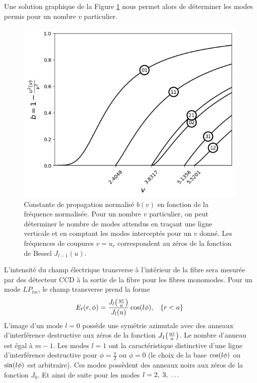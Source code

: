 \documentclass[10pt,letterpaper,twocolumn]{article}
\newcommand{\s}{\hspace{0.1cm}}
\DeclarePairedDelimiter\autobracket{(}{)}
\newcommand{\br}[1]{\autobracket*{#1}}
\begin{document}
Une solution graphique de la Figure \ref{fig:th1} nous permet alors de déterminer les modes permis pour un nombre $v$ particulier.
\begin{figure}[H]
	\centering
	\includegraphics[width=\linewidth]{figures/theory.png}
	\caption{Constante de propagation normalisé $b(v)$ en fonction de la fréquence normalisée. Pour un nombre $v$ particulier, on peut déterminer le nombre de modes attendus en traçant une ligne verticale et en comptant les modes interceptés pour un $v$ donné. Les fréquences de coupures $v = u_c$ correspondent au zéros de la fonction de Bessel $J_{l-1}(u)$.}
	\label{fig:th1}
\end{figure}\par
L'intensité du champ électrique transverse à l'intérieur de la fibre sera mesurée par des détecteur CCD à la sortie de la fibre pour les fibres monomodes. Pour un mode $LP_{lm}$, le champ transverse prend la forme\supercite{Gloge1971}
\begin{equation}\label{eq:CTransverse}
	E_t(r, \phi) = \frac{J_l\br{\frac{ur}{a}}}{J_l(u)} \cos\br{l\phi},\hspace{0.3cm} \{r < a\}
\end{equation}
L'image d'un mode $l=0$ possède une symétrie azimutale avec des anneaux d'interférence destructive aux zéros de la fonction $J_1\br{\frac{ur}{a}}$. Le nombre d'anneau est égal à $m-1$. Les modes $l=1$ ont la caractéristique distinctive d'une ligne d'interférence destructive pour $\phi = \frac{\pi}{2}$ ou $\phi=0$ (le choix de la base $\cos\br{l\phi}$ ou $\sin\br{l\phi}$ est arbitraire). Ces modes possèdent des anneaux noirs aux zéros de la fonction $J_0$. Et ainsi de suite pour les modes $l=2,\s 3,\s\dots$
\end{document}
